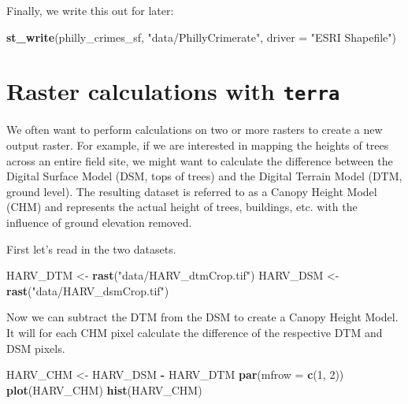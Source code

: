 \documentclass[
]{book}
\newenvironment{Shaded}{\begin{snugshade}}{\end{snugshade}}
\newcommand{\AttributeTok}[1]{\textcolor[rgb]{0.13,0.29,0.53}{#1}}
\newcommand{\DecValTok}[1]{\textcolor[rgb]{0.00,0.00,0.81}{#1}}
\newcommand{\FunctionTok}[1]{\textcolor[rgb]{0.13,0.29,0.53}{\textbf{#1}}}
\newcommand{\NormalTok}[1]{#1}
\newcommand{\OtherTok}[1]{\textcolor[rgb]{0.56,0.35,0.01}{#1}}
\newcommand{\SpecialCharTok}[1]{\textcolor[rgb]{0.81,0.36,0.00}{\textbf{#1}}}
\newcommand{\StringTok}[1]{\textcolor[rgb]{0.31,0.60,0.02}{#1}}
\begin{document}
Finally, we write this out for later:

\begin{Shaded}
\begin{Highlighting}[]
\FunctionTok{st\_write}\NormalTok{(philly\_crimes\_sf, }\StringTok{"data/PhillyCrimerate"}\NormalTok{, }\AttributeTok{driver =} \StringTok{"ESRI Shapefile"}\NormalTok{)}
\end{Highlighting}
\end{Shaded}

\hypertarget{raster-calculations-with-terra}{%
\section{\texorpdfstring{Raster calculations with \texttt{terra}}{Raster calculations with terra}}\label{raster-calculations-with-terra}}

We often want to perform calculations on two or more rasters to create a new output raster. For example, if we are interested in mapping the heights of trees across an entire field site, we might want to calculate the difference between the Digital Surface Model (DSM, tops of trees) and the Digital Terrain Model (DTM, ground level). The resulting dataset is referred to as a Canopy Height Model (CHM) and represents the actual height of trees, buildings, etc. with the influence of ground elevation removed.

First let's read in the two datasets.

\begin{Shaded}
\begin{Highlighting}[]
\NormalTok{HARV\_DTM }\OtherTok{\textless{}{-}} \FunctionTok{rast}\NormalTok{(}\StringTok{"data/HARV\_dtmCrop.tif"}\NormalTok{)}
\NormalTok{HARV\_DSM }\OtherTok{\textless{}{-}} \FunctionTok{rast}\NormalTok{(}\StringTok{"data/HARV\_dsmCrop.tif"}\NormalTok{)}
\end{Highlighting}
\end{Shaded}

Now we can subtract the DTM from the DSM to create a Canopy Height Model. It will for each CHM pixel calculate the difference of the respective DTM and DSM pixels.

\begin{Shaded}
\begin{Highlighting}[]
\NormalTok{HARV\_CHM }\OtherTok{\textless{}{-}}\NormalTok{ HARV\_DSM }\SpecialCharTok{{-}}\NormalTok{ HARV\_DTM}
\FunctionTok{par}\NormalTok{(}\AttributeTok{mfrow =} \FunctionTok{c}\NormalTok{(}\DecValTok{1}\NormalTok{, }\DecValTok{2}\NormalTok{))}
\FunctionTok{plot}\NormalTok{(HARV\_CHM)}
\FunctionTok{hist}\NormalTok{(HARV\_CHM)}
\end{Highlighting}
\end{Shaded}
\end{document}
